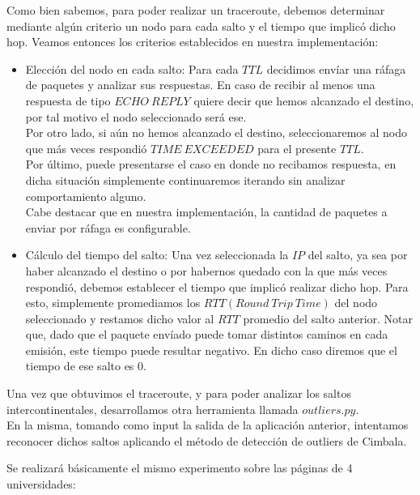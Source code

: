 Como bien sabemos, para poder realizar un traceroute, debemos determinar mediante algún criterio un nodo para cada salto y el tiempo que implicó dicho hop.
Veamos entonces los criterios establecidos en nuestra implementación:
\begin{itemize}
	\item Elección del nodo en cada salto: Para cada $TTL$ decidimos envíar una ráfaga de paquetes y analizar sus respuestas. En caso de recibir al menos una respuesta de tipo $ECHO\ REPLY$ quiere decir que hemos alcanzado el destino, por tal motivo el nodo seleccionado será ese. \\
Por otro lado, si aún no hemos alcanzado el destino, seleccionaremos al nodo que más veces respondió $TIME\ EXCEEDED$ para el presente $TTL$.\\
Por último, puede presentarse el caso en donde no recibamos respuesta, en dicha situación simplemente continuaremos iterando sin analizar comportamiento alguno. \\
Cabe destacar que en nuestra implementación, la cantidad de paquetes a enviar por ráfaga es configurable.
	\item Cálculo del tiempo del salto: Una vez seleccionada la $IP$ del salto, ya sea por haber alcanzado el destino o por habernos quedado con la que más veces respondió, debemos establecer el tiempo que implicó realizar dicho hop. Para esto, simplemente promediamos los $RTT (Round\ Trip\ Time)$ del nodo seleccionado y restamos dicho valor al $RTT$ promedio del salto anterior. Notar que, dado que el paquete envíado puede tomar distintos caminos en cada emisión, este tiempo puede resultar negativo. En dicho caso diremos que el tiempo de ese salto es 0.
\end{itemize}


Una vez que obtuvimos el traceroute, y para poder analizar los saltos intercontinentales, desarrollamos otra herramienta llamada $outliers.py$. \\
En la misma, tomando como input la salida de la aplicación anterior, intentamos reconocer dichos saltos aplicando el método de detección de outliers de Cimbala. 

\newpage


Se realizará básicamente el mismo experimento sobre las páginas de 4 universidades:

